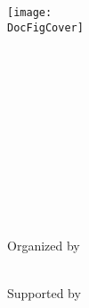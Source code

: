 \thispagestyle{empty}
{\center
{\Large \bf \DocConferenceTitleA} \\[14mm]
{\LARGE \bf \DocConferenceTitleB} \\ [6mm]
{\LARGE \bf \DocYear} \\ [14mm] %
{\large \DocTitle} \\
\begin{center} \setlength{\unitlength}{1cm}
  \texttt{[image: \\DocFigCover]}
\end{center}
\DocDate \\ %
\DocPlace \\[3mm]%
\DocURL \\
}
\newpage


\thispagestyle{empty}




\thispagestyle{empty}
\setcounter{page}{1}
{\center
{\Large \bf \DocConferenceTitleA}\\  [14mm]

{\LARGE \bf \DocConferenceTitleB} \\ [6mm]
{\LARGE \bf \DocYear} \\ [6mm]
{\Large \DocTitle}  \\ [16mm]

{\large \DocYear} \\[3mm]
{\large \DocPlace} \\[6mm]
{\large \DocURL}\\[10mm]
{\Large Organized by} \\ [3mm]
{\large \DocOrganizer} \\[10mm] %

\vfill



{\Large Supported by} \\ [3mm]
\DocSponsors }
\newpage



\newpage
\thispagestyle{empty}

\vspace*{9cm}


